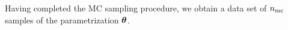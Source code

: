 Having completed the MC sampling procedure, we obtain a data set of ${n_\text{mc}}$ samples of the parametrization ${\boldsymbol\theta}$.

